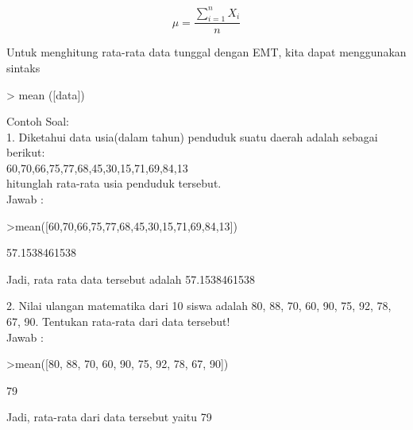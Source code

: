 \documentclass[a4paper,10pt]{article}
\begin{document}
\begin{eulernotebook}
\begin{eulercomment}
\begin{eulercomment}
\begin{eulercomment}
\begin{eulercomment}
\begin{eulercomment}
\begin{eulercomment}
\begin{eulercomment}
\begin{eulercomment}
\begin{eulercomment}
\begin{eulercomment}
\begin{eulercomment}
\end{eulercomment}
\begin{eulerformula}
\[
\mu=\frac{\sum_{i=1}^{n} X_i}{n}
\]
\end{eulerformula}
\begin{eulercomment}
Untuk menghitung rata-rata data tunggal dengan EMT, kita dapat
menggunakan sintaks

\textgreater{} mean ([data])

Contoh Soal:\\
1. Diketahui data usia(dalam tahun) penduduk suatu daerah adalah
sebagai berikut:\\
60,70,66,75,77,68,45,30,15,71,69,84,13\\
hitunglah rata-rata usia penduduk tersebut.\\
Jawab :
\end{eulercomment}
\begin{eulerprompt}
>mean([60,70,66,75,77,68,45,30,15,71,69,84,13])
\end{eulerprompt}
\begin{euleroutput}
  57.1538461538
\end{euleroutput}
\begin{eulercomment}
Jadi, rata rata data tersebut adalah 57.1538461538

2. Nilai ulangan matematika dari 10 siswa adalah 80, 88, 70, 60, 90,
75, 92, 78, 67, 90. Tentukan rata-rata dari data tersebut!\\
Jawab :
\end{eulercomment}
\begin{eulerprompt}
>mean([80, 88, 70, 60, 90, 75, 92, 78, 67, 90])
\end{eulerprompt}
\begin{euleroutput}
  79
\end{euleroutput}
\begin{eulercomment}
Jadi, rata-rata dari data tersebut yaitu 79


\end{eulercomment}
\end{eulercomment}
\end{eulercomment}
\end{eulercomment}
\end{eulercomment}
\end{eulercomment}
\end{eulercomment}
\end{eulercomment}
\end{eulercomment}
\end{eulercomment}
\end{eulercomment}
\end{eulernotebook}
\end{document}
